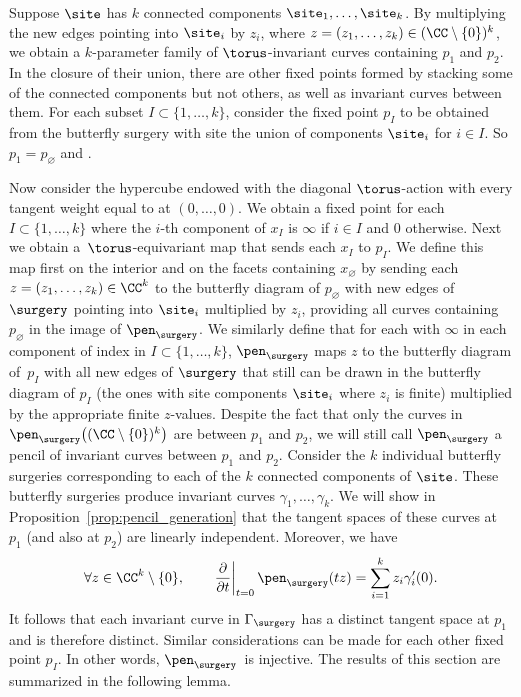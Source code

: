 Suppose $\site$ has $k$ connected components $\site_1,\dots ,\site_k$. By multiplying the new edges pointing into $\site_i$ by $z_i$, where $z = (z_1, \dots , z_k)\in(\CC\setminus\{0\})^k$, we obtain a $k$-parameter family of $\torus$-invariant curves containing $p_1$ and $p_2$. In the closure of their union, there are other fixed points formed by stacking some of the connected components but not others, as well as invariant curves between them. For each subset $I\subset \{1,\dots ,k\}$, consider the fixed point $p_I$ to be obtained from the butterfly surgery with site the union of components $\site_i$ for $i\in I$. So $p_1 = p_\varnothing$ and .

Now consider the hypercube  endowed with the diagonal $\torus$-action with every tangent weight equal to  at $(0,\dots ,0)$. We obtain a fixed point  for each $I\subset \{1,\dots ,k\}$ where the $i$-th component of $x_I$ is $\infty$ if $i\in I$ and $0$ otherwise. Next we obtain a~$\torus$-equivariant map  that sends each $x_I$ to $p_I$. We define this map first on the interior and on the facets containing $x_\varnothing$ by sending each $z = (z_1, \dots , z_k)\in\CC^k$ to the butterfly diagram of $p_\varnothing$ with new edges of $\surgery$ pointing into $\site_i$ multiplied by $z_i$, providing all curves containing $p_\varnothing$ in the image of $\pen_\surgery$. We similarly define that for each  with $\infty$ in each component of index in $I\subset\{1,\dots ,k\}$, $\pen_\surgery$ maps $z$ to the butterfly diagram of~$p_I$ with all new edges of $\surgery$ that still can be drawn in the butterfly diagram of $p_I$ (the ones with site components $\site_i$ where $z_i$ is finite) multiplied by the appropriate finite $z$-values. Despite the fact that only the curves in $\pen_\surgery\bigl((\CC\setminus\{0\})^k\bigr)$ are between $p_1$ and $p_2$, we will still call $\pen_\surgery$ a pencil of invariant curves between $p_1$ and $p_2$.
Consider the $k$ individual butterfly surgeries corresponding to each of the $k$ connected components of $\site$. These butterfly surgeries produce invariant curves $\gamma_1, \dots , \gamma_k$. We will show in Proposition~\ref{prop:pencil_generation} that the tangent spaces of these curves at $p_1$ (and also at $p_2$) are linearly independent. Moreover, we have
\[
\forall z\in\CC^k\setminus\{0\},\qquad \left. \frac{\partial}{\partial t} \right|_{t=0} \pen_\surgery(tz) = \sum_{i = 1}^k z_i\gamma_i'(0).
\]
It follows that each invariant curve in $\Gamma_\surgery$ has a distinct tangent space at $p_1$ and is therefore distinct. Similar considerations can be made for each other fixed point $p_I$. In other words, $\pen_\surgery$~is injective. The results of this section are summarized in the following lemma.

